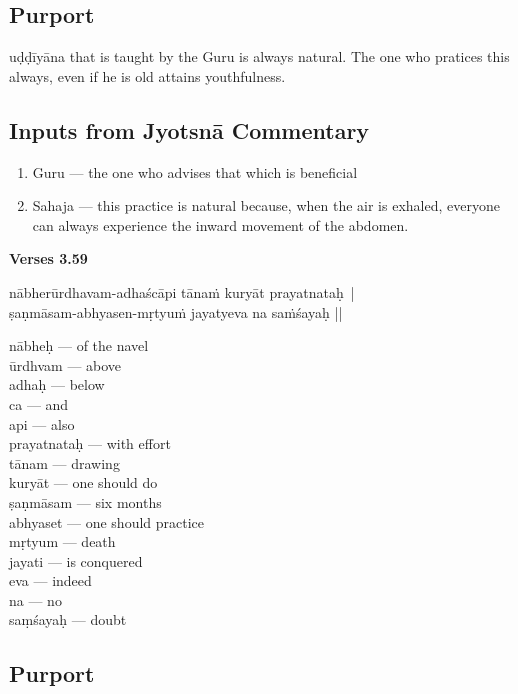 \subsection*{Purport}

uḍḍīyāna that is taught by the Guru is always natural. The one who pratices this always, even if he is old attains youthfulness. 

\subsection*{Inputs from Jyotsnā Commentary}

\begin{enumerate}
\item Guru --- the one who advises that which is beneficial 
\item Sahaja --- this practice is natural because, when the air is exhaled, everyone can always experience the inward movement of the abdomen. 
\end{enumerate}


\noindent \textbf{Verses 3.59}

\begin{shloka}
nābherūrdhavam-adhaścāpi tānaṁ kuryāt prayatnataḥ |\\
ṣaṇmāsam-abhyasen-mṛtyuṁ jayatyeva na saṁśayaḥ ||
\end{shloka}

\begin{multicols}{2}
nābheḥ --- of the navel \\
ūrdhvam --- above \\
adhaḥ --- below \\
ca --- and \\
api --- also \\
prayatnataḥ --- with effort \\
tānam --- drawing   \\
kuryāt --- one should do \\
ṣaṇmāsam --- six months \\
abhyaset --- one should practice \\
mṛtyum --- death \\
jayati --- is conquered \\
eva --- indeed  \\
na ---  no\\
saṃśayaḥ --- doubt
\end{multicols}

\subsection*{Purport}

